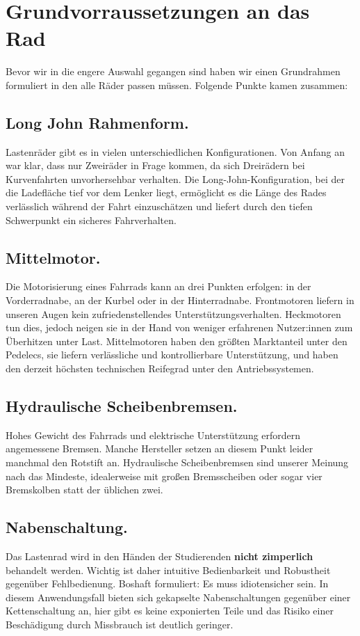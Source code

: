 \documentclass[a4paper,ngerman, 14pt] {scrartcl}
\begin{document}
\section{Grundvorraussetzungen an das Rad}
Bevor wir in die engere Auswahl gegangen sind haben wir einen Grundrahmen formuliert in den alle Räder passen müssen. Folgende Punkte kamen zusammen:\\
\subsection{Long John Rahmenform.} Lastenräder gibt es in vielen unterschiedlichen Konfigurationen. Von Anfang an war klar, dass nur Zweiräder in Frage kommen, da sich Dreirädern bei Kurvenfahrten unvorhersehbar verhalten. Die Long-John-Konfiguration, bei der die Ladefläche tief vor dem Lenker liegt, ermöglicht es die Länge des Rades verlässlich während der Fahrt einzuschätzen und liefert durch den tiefen Schwerpunkt ein sicheres Fahrverhalten.

\subsection{Mittelmotor.} Die Motorisierung eines Fahrrads kann an drei Punkten erfolgen: in der Vorderradnabe, an der Kurbel oder in der Hinterradnabe. Frontmotoren liefern in unseren Augen kein zufriedenstellendes Unterstützungsverhalten. Heckmotoren tun dies, jedoch neigen sie in der Hand von weniger erfahrenen Nutzer:innen zum Überhitzen unter Last. Mittelmotoren haben den größten Marktanteil unter den Pedelecs, sie liefern verlässliche und kontrollierbare Unterstützung, und haben den derzeit höchsten technischen Reifegrad unter den Antriebssystemen.

\subsection{Hydraulische Scheibenbremsen.} Hohes Gewicht des Fahrrads und elektrische Unterstützung erfordern angemessene Bremsen. Manche Hersteller setzen an diesem Punkt leider manchmal den Rotstift an. Hydraulische Scheibenbremsen sind unserer Meinung nach das Mindeste, idealerweise mit großen Bremsscheiben oder sogar vier Bremskolben statt der üblichen zwei.

\subsection{Nabenschaltung.} Das Lastenrad wird in den Händen der Studierenden \textbf{nicht zimperlich} behandelt werden. Wichtig ist daher intuitive Bedienbarkeit und Robustheit gegenüber Fehlbedienung. Boshaft formuliert: Es muss idiotensicher sein. In diesem Anwendungsfall bieten sich gekapselte Nabenschaltungen gegenüber einer Kettenschaltung an, hier gibt es keine exponierten Teile und das Risiko einer Beschädigung durch Missbrauch ist deutlich geringer.
\end{document}
